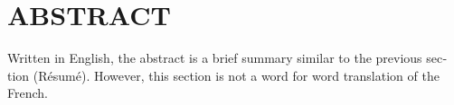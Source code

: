 %

\chapter*{ABSTRACT}\thispagestyle{headings}
%
\begin{otherlanguage}{english}

Written in English, the abstract is a brief summary similar to the previous
section {(Résumé)}.  However, this section is not a
word for word translation of the French.

\end{otherlanguage}
